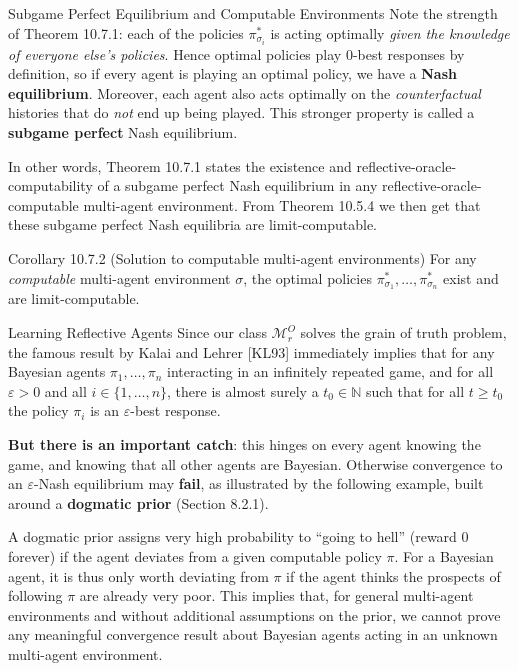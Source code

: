 \documentclass[aspectratio=169,10pt]{beamer}
\newcommand{\N}{\mathbb{N}}
\newcommand{\Mc}{\mathcal{M}}
\begin{document}
\begin{frame}{Subgame Perfect Equilibrium and Computable Environments}
  Note the strength of Theorem 10.7.1: each of the policies
  $\pi^*_{\sigma_i}$ is acting optimally \emph{given the knowledge of
  everyone else's policies}. Hence optimal policies play $0$-best
  responses by definition, so if every agent is playing an optimal policy,
  we have a \textbf{Nash equilibrium}. Moreover, each agent also acts
  optimally on the \emph{counterfactual} histories that do \emph{not} end
  up being played. This stronger property is called a
  \textbf{subgame perfect} Nash equilibrium.

  \vspace{0.3em}
  In other words, Theorem 10.7.1 states the existence and
  reflective-oracle-computability of a subgame perfect Nash equilibrium in
  any reflective-oracle-computable multi-agent environment. From
  Theorem 10.5.4 we then get that these subgame perfect Nash equilibria
  are limit-computable.
  \begin{block}{Corollary 10.7.2 (Solution to computable multi-agent environments)}
    For any \emph{computable} multi-agent environment $\sigma$, the
    optimal policies $\pi^*_{\sigma_1},\ldots,\pi^*_{\sigma_n}$ exist and
    are limit-computable.
  \end{block}
\end{frame}

\begin{frame}{Learning Reflective Agents}
  Since our class $\Mc_r^O$ solves the grain of truth problem, the famous
  result by Kalai and Lehrer {\footnotesize[KL93]} immediately implies
  that for any Bayesian agents $\pi_1,\ldots,\pi_n$ interacting in an
  infinitely repeated game, and for all $\varepsilon>0$ and all
  $i\in\{1,\ldots,n\}$, there is almost surely a $t_0\in\N$ such that for
  all $t\geq t_0$ the policy $\pi_i$ is an $\varepsilon$-best response.

  \vspace{0.3em}
  \textbf{But there is an important catch}: this hinges on every agent
  knowing the game, and knowing that all other agents are Bayesian.
  Otherwise convergence to an $\varepsilon$-Nash equilibrium may
  \textbf{fail}, as illustrated by the following example, built around a
  \textbf{dogmatic prior} (Section 8.2.1).

  \vspace{0.3em}
  A dogmatic prior assigns very high probability to ``going to hell''
  (reward $0$ forever) if the agent deviates from a given computable
  policy $\pi$. For a Bayesian agent, it is thus only worth deviating from
  $\pi$ if the agent thinks the prospects of following $\pi$ are already
  very poor. This implies that, for general multi-agent environments and
  without additional assumptions on the prior, we cannot prove any
  meaningful convergence result about Bayesian agents acting in an unknown
  multi-agent environment.
\end{frame}
\end{document}
